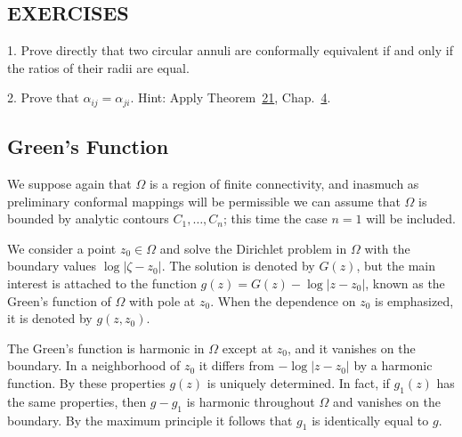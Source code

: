 \subsection*{EXERCISES}
1. Prove directly that two circular annuli are conformally equivalent if and only if the ratios of their radii are equal.

2. Prove that $\alpha_{ij} = \alpha_{ji}$. Hint: Apply Theorem~\hyperref[thm:4.21]{21}, Chap.~\hyperref[chap:4]{4}.

\setcounter{section}{5}\setcounter{subsection}{1}\subsection{Green's Function}\label{sec:6.5.2}
We suppose again that $\Omega$ is a region of finite connectivity, and inasmuch as preliminary conformal mappings will be permissible we can assume that $\Omega$ is bounded by analytic contours $C_1, \ldots, C_n$; this time the case $n = 1$ will be included.

We consider a point $z_{0} \in \Omega$ and solve the Dirichlet problem in $\Omega$ with the boundary values $\log |\zeta - z_{0}|$. The solution is denoted by $G(z)$, but the main interest is attached to the function $g(z) = G(z) - \log |z - z_{0}|$, known as the Green's function of $\Omega$ with pole at $z_{0}$. When the dependence on $z_{0}$ is emphasized, it is denoted by $g(z, z_{0})$.

The Green's function is harmonic in $\Omega$ except at $z_0$, and it vanishes on the boundary. In a neighborhood of $z_0$ it differs from $-\log |z - z_0|$ by a harmonic function. By these properties $g(z)$ is uniquely determined. In fact, if $g_1(z)$ has the same properties, then $g - g_1$ is harmonic throughout $\Omega$ and vanishes on the boundary. By the maximum principle it follows that $g_1$ is identically equal to $g$.

